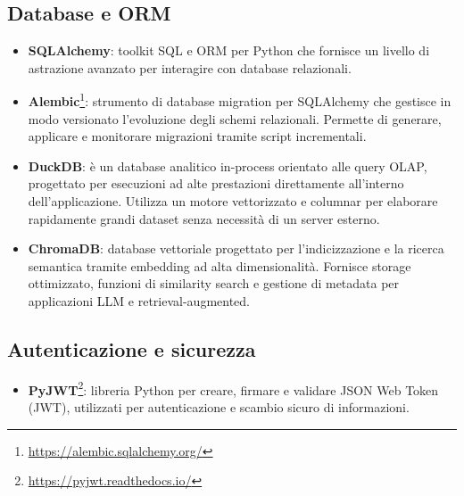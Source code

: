 \subsection{Database e ORM}
\begin{itemize}
    \item \textbf{SQLAlchemy}: toolkit SQL e ORM per Python che fornisce un livello di astrazione avanzato per interagire con database relazionali.
    \item \textbf{Alembic}\footnote{\url{https://alembic.sqlalchemy.org/}}: strumento di database migration per SQLAlchemy che gestisce in modo versionato l’evoluzione degli schemi relazionali. Permette di generare, applicare e monitorare migrazioni tramite script incrementali.
    \item \textbf{DuckDB}: è un database analitico in-process orientato alle query OLAP, progettato per esecuzioni ad alte prestazioni direttamente all’interno dell’applicazione. Utilizza un motore vettorizzato e columnar per elaborare rapidamente grandi dataset senza necessità di un server esterno.
    \item \textbf{ChromaDB}: database vettoriale progettato per l’indicizzazione e la ricerca semantica tramite embedding ad alta dimensionalità. Fornisce storage ottimizzato, funzioni di similarity search e gestione di metadata per applicazioni LLM e retrieval-augmented.
\end{itemize}

\subsection{Autenticazione e sicurezza}
\begin{itemize}
    \item \textbf{PyJWT}\footnote{\url{https://pyjwt.readthedocs.io/}}: libreria Python per creare, firmare e validare JSON Web Token (JWT), utilizzati per autenticazione e scambio sicuro di informazioni.
\end{itemize}

